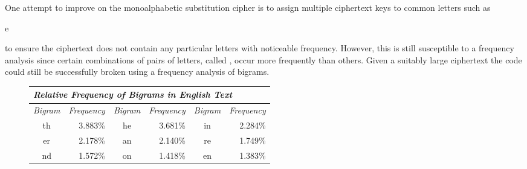 One attempt to improve on the monoalphabetic substitution cipher is to assign
multiple ciphertext keys to common letters such as \begin{code}e\end{code} to ensure
the ciphertext does not contain any particular letters with noticeable frequency.
However, this is still susceptible to a frequency analysis since certain combinations
of pairs of letters, called , occur more frequently than others.
Given a suitably large ciphertext the code could still be successfully broken using
a frequency analysis of bigrams.
\begin{figure*}[htb]\begin{center}
\begin{tabular}{|c|r|c|r|c|r|} \hline
  \multicolumn{6}{|l|}{\textit{Relative Frequency of Bigrams in English Text}} \\ \hline\hline
  \textit{Bigram} & \textit{Frequency} & \textit{Bigram} & \textit{Frequency}
  & \textit{Bigram} & \textit{Frequency} \\ \hline
  th & 3.883\% &
  he & 3.681\% &
  in & 2.284\% \\
  er & 2.178\% &
  an & 2.140\% &
  re & 1.749\% \\
  nd & 1.572\% &
  on & 1.418\% &
  en & 1.383\% \\ \hline
\end{tabular}\end{center}
\end{figure*}

